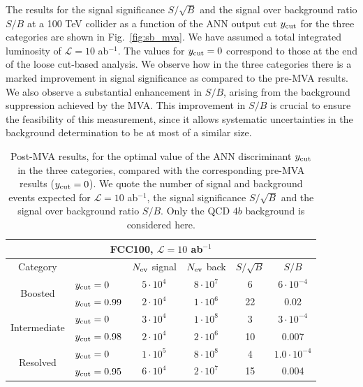 \documentclass[a4paper,10pt]{article}
\begin{document}
The results for the signal significance $S/\sqrt{B}$ and
the signal over background ratio
$S/B$ at a 100 TeV collider as a function of the ANN output cut $y_{\rm cut}$
for the three categories are shown in 
Fig.~\ref{fig:sb_mva}.
%
We have assumed a total integrated luminosity of $\mathcal{L}=10$ ab$^{-1}$.
%
The values 
for $y_{\rm cut}=0$ correspond to those at
the end of the loose cut-based analysis.
%
We observe how in the three
 categories there is a marked  improvement in signal
significance as compared to the pre-MVA results.
%
We also observe a substantial enhancement in $S/B$, arising
from the background suppression achieved by the MVA.
%
This improvement in $S/B$ is crucial to ensure the feasibility
of this measurement, since it allows systematic
uncertainties in the background determination to
be at most of a similar size.


\begin{table}[t]
  \centering
  \begin{tabular}{|c|l|c|c|c|c|}
    \hline
    \multicolumn{6}{|c|}{FCC100, $\mathcal{L}=10$ ab$^{-1}$} \\
    \hline
    \hline
    Category  &   &  $N_{\rm ev}$ signal &  $N_{\rm ev}$ back  &  $S/\sqrt{B}$ & $S/B$ \\ 
    \hline
    \hline
    \multirow{2}{*}{Boosted} &  $y_{\rm cut}=0$  &       $5\cdot 10^4$    &   $8\cdot 10^7$        &  6        &    $6\cdot 10^{-4}$         \\
    &  $y_{\rm cut}=0.99$ &   $2\cdot 10^4$    &  $1\cdot 10^6$         &      22    &    0.02     \\
    \hline
    \hline
    \multirow{2}{*}{Intermediate} &  $y_{\rm cut}=0$  &   $3\cdot 10^4$     & $1\cdot 10^8$  & 3   &  $3\cdot 10^{-4}$ \\
       &  $y_{\rm cut}=0.98$ &         $2\cdot 10^4$       &  $2\cdot 10^6$   &  10   & 0.007         \\
    \hline
    \hline
      \multirow{2}{*}{Resolved} &  $y_{\rm cut}=0$  &  $1\cdot 10^5$      & $8\cdot 10^8$  &   4  & $1.0\cdot 10^{-4}$  \\
    &  $y_{\rm cut}=0.95 $ &    $6\cdot 10^4$    &   $2\cdot 10^7$        &    15      &    0.004     \\
    \hline
      \end{tabular}
  \caption{\small Post-MVA results, for the optimal value of the
    ANN discriminant $y_{\rm cut}$ in the three categories, compared with the
    corresponding
    pre-MVA results ($y_{\rm cut}=0$).
    We quote the number of signal and
    background events expected for $\mathcal{L}=10$ ab$^{-1}$,
    the signal significance $S/\sqrt{B}$ and
    the signal over background ratio $S/B$.
    Only the QCD $4b$ background is considered here.
    \label{table:cutflowMVA}
  }
\end{table}
\end{document}
